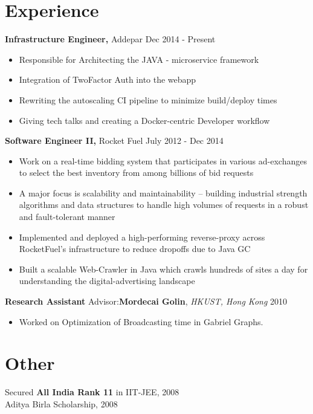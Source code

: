 \documentclass[margin]{res}
\begin{document}
\begin{resume}
\section{Experience}
 {\bf Infrastructure Engineer,} Addepar \hfill Dec  2014  - Present
 \begin{itemize} \itemsep -2pt  %
 \item Responsible for Architecting the JAVA - microservice framework
 \item Integration of TwoFactor Auth into the webapp
 \item Rewriting the autoscaling CI pipeline to minimize build/deploy times
 \item Giving tech talks and creating a Docker-centric Developer workflow
 \end{itemize}

 {\bf Software Engineer II,} Rocket Fuel \hfill July 2012 - Dec 2014
 \begin{itemize} \itemsep -2pt  %
 \item Work on a real-time bidding system that participates in various ad-exchanges to select the best inventory from among billions of bid requests
 \item A major focus is scalability and maintainability -- building industrial strength algorithms and data structures to handle high volumes of requests in a robust and fault-tolerant manner
 \item Implemented and deployed a high-performing reverse-proxy across RocketFuel's infrastructure to reduce dropoffs due to Java GC
 \item Built a scalable Web-Crawler in Java which crawls hundreds of sites a day for understanding the digital-advertising landscape
 \end{itemize}

 {\bf Research Assistant} Advisor:\textbf{Mordecai Golin}, \textit{HKUST, Hong Kong} \hfill 2010
 \begin{itemize} \itemsep -2pt  %
 \item Worked  on  Optimization  of  Broadcasting  time  in  Gabriel  Graphs.
 \end{itemize}


\section{Other}
 Secured {\bf All India Rank 11} in IIT-JEE, 2008 \\
 Aditya Birla Scholarship, 2008 \\



\end{resume}
\end{document}
